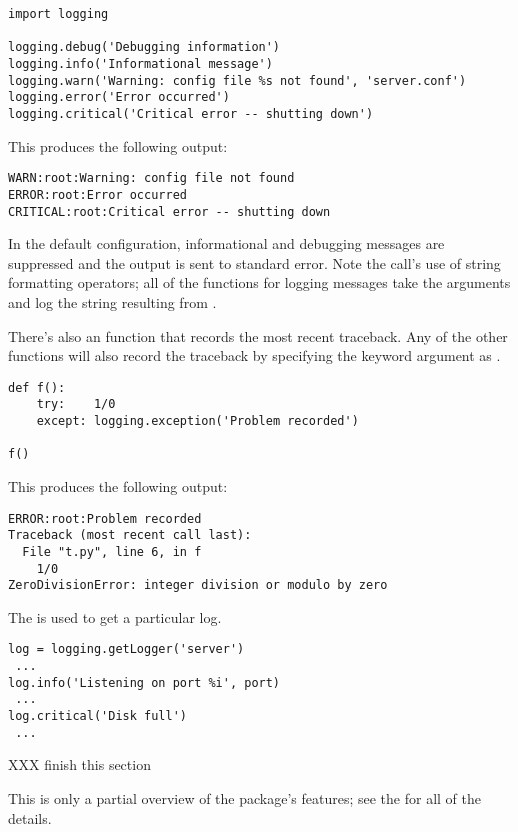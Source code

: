 \documentclass{howto}
\begin{document}
\begin{verbatim}
import logging

logging.debug('Debugging information')
logging.info('Informational message')
logging.warn('Warning: config file %s not found', 'server.conf')
logging.error('Error occurred')
logging.critical('Critical error -- shutting down')
\end{verbatim}

This produces the following output:

\begin{verbatim}
WARN:root:Warning: config file not found
ERROR:root:Error occurred
CRITICAL:root:Critical error -- shutting down
\end{verbatim}

In the default configuration, informational and debugging messages are
suppressed and the output is sent to standard error.  Note the
 call's use of string formatting operators; all of
the functions for logging messages take the arguments 
 and log the string resulting from
.

There's also an  function that records the most
recent traceback.  Any of the other functions will also record the
traceback by specifying the keyword argument  as
.

\begin{verbatim}
def f():
    try:    1/0
    except: logging.exception('Problem recorded')

f()
\end{verbatim}

This produces the following output:

\begin{verbatim}
ERROR:root:Problem recorded
Traceback (most recent call last):
  File "t.py", line 6, in f
    1/0
ZeroDivisionError: integer division or modulo by zero
\end{verbatim}

The  is used to get a particular log.

\begin{verbatim}
log = logging.getLogger('server')
 ...
log.info('Listening on port %i', port)
 ...
log.critical('Disk full')
 ...
\end{verbatim}

XXX finish this section

This is only a partial overview of the  package's
features; see the
 for all of the details.
\end{document}
